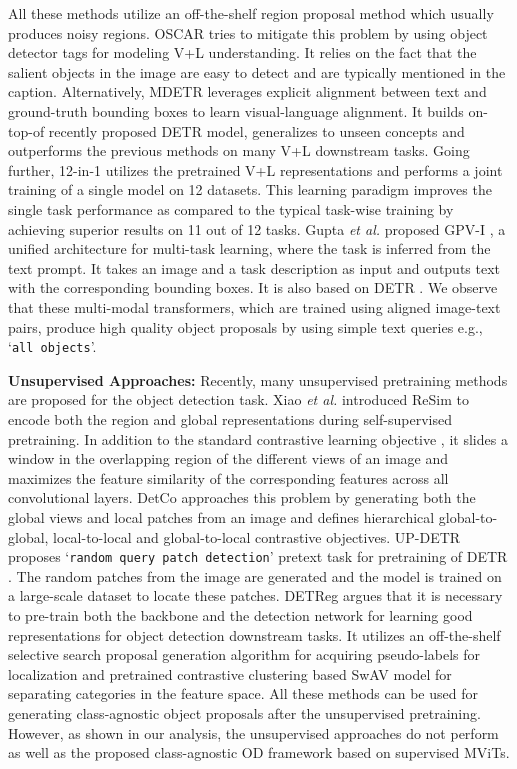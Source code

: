 \documentclass[runningheads]{llncs}
\def\etal{\emph{et al.}\xspace}
\newcommand{\txt}[1]{{\texttt{#1}}}
\begin{document}
All these methods utilize an off-the-shelf region proposal method \cite{ren2015faster} which usually produces noisy regions. OSCAR \cite{OSCAR} tries to mitigate this problem by using object detector tags for modeling V+L understanding. It relies on the fact that the salient objects in the image are easy to detect and are typically mentioned in the caption. Alternatively, MDETR \cite{mdetr} leverages explicit alignment between text and ground-truth bounding boxes to learn visual-language alignment. It builds on-top-of recently proposed DETR \cite{DETR} model, generalizes to unseen concepts and outperforms the previous methods on many V+L downstream tasks.
Going further, 12-in-1 \cite{12-in-1} utilizes the pretrained V+L representations and performs a joint training of a single model on 12 datasets. This learning paradigm improves the single task performance as compared to the typical task-wise training by achieving superior results on 11 out of 12 tasks. Gupta \etal proposed GPV-I \cite{gpv1}, a unified architecture for multi-task learning, where the task is inferred from the text prompt. It takes an image and a task description as input and outputs text with the corresponding bounding boxes. It is also based on DETR \cite{DETR}. We observe that these \cite{mdetr,gpv1} multi-modal transformers, which are trained using aligned image-text pairs, produce high quality object proposals by using simple text queries e.g., ‘\txt{all objects}'.

\noindent \textbf{Unsupervised Approaches:} Recently, many unsupervised pretraining methods are proposed for the object detection task. Xiao \etal introduced ReSim \cite{xiao2021region} to encode both the region and global representations during self-supervised pretraining. In addition to the standard contrastive learning objective \cite{MoCo,pmlr-v119-chen20j}, it slides a window in the overlapping region of the different views of an image and maximizes the feature similarity of the corresponding features across all convolutional layers. DetCo \cite{xie2021detco} approaches this problem by generating both the global views and local patches from an image and defines hierarchical global-to-global, local-to-local and global-to-local contrastive objectives. UP-DETR \cite{dai2021up} proposes ‘\txt{random query patch detection}' pretext task for pretraining of DETR \cite{DETR}. The random patches from the image are generated and the model is trained on a large-scale dataset to locate these patches. DETReg \cite{detreg} argues that it is necessary to pre-train both the backbone and the detection network for learning good representations for object detection downstream tasks. It utilizes an off-the-shelf selective search \cite{uijlings2013selective} proposal generation algorithm for acquiring pseudo-labels for localization and pretrained contrastive clustering based SwAV \cite{SwAV} model for separating categories in the feature space. All these methods can be used for generating class-agnostic object proposals after the unsupervised pretraining. However, as shown in our analysis, the unsupervised approaches do not perform as well as the proposed class-agnostic OD framework based on supervised MViTs.
\end{document}
